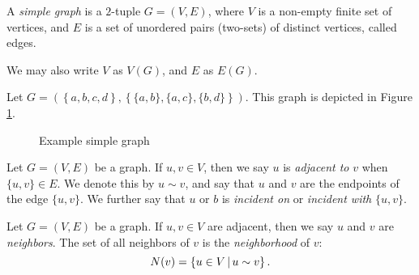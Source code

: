 \begin{defn}
    A \emph{simple graph} is a $2$-tuple $G = (V, E)$, where $V$ is a non-empty finite set of vertices, and $E$ is a set of unordered pairs (two-sets) of distinct vertices, called edges.
\end{defn}

\begin{rmk}
    We may also write $V$ as $V(G)$, and $E$ as $E(G)$.
\end{rmk}

\begin{exmp}
    Let $G = \left(\left\{a, b, c, d\right\}, \left\{\{a, b\}, \{a, c\}, \{b, d\}\right\}\right)$. This graph is depicted in Figure \ref{fig:example-simple-graph}.
\end{exmp}

\begin{figure}[ht!]
    \centering
\caption{Example simple graph}
\label{fig:example-simple-graph}
\end{figure}

\begin{defn}
    Let $G = (V, E)$ be a graph. If $u, v \in V$, then we say $u$ is \emph{adjacent to} $v$ when $\{u, v\} \in E$. We denote this by $u \sim v$, and say that $u$ and $v$ are the endpoints of the edge $\{u, v\}$. We further say that $u$ or $b$ is \emph{incident on} or \emph{incident with} $\{u, v\}$.
\end{defn}

\begin{defn}
    Let $G = (V, E)$ be a graph. If $u, v \in V$ are adjacent, then we say $u$ and $v$ are \emph{neighbors}. The set of all neighbors of $v$ is the \emph{neighborhood} of $v$:
    \[N(v) = \left\{u \in V \,\middle|\, u \sim v \right\}.\]
\end{defn}


